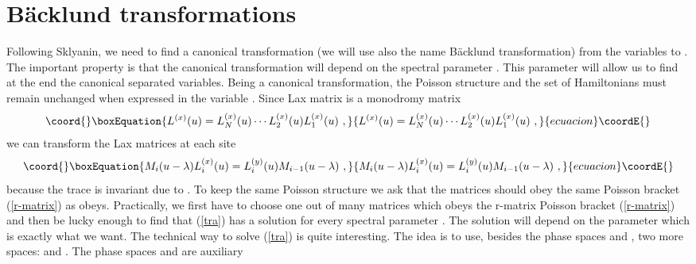 \documentclass[a4paper,11pt]{article}
\begin{document}
\section{B\"acklund transformations }
Following Sklyanin, we need to find a canonical transformation (we will use
also the name B\"acklund transformation) from the variables \coordHE{} to
\coordHE{}. The important property is that the canonical transformation will
depend on the spectral parameter \myHighlight{$\lambda $}\coordHE{}. This parameter \myHighlight{$\lambda $}\coordHE{} will
allow us to find at the end the canonical separated variables. Being a
canonical transformation, the Poisson structure and the set of Hamiltonians
\coordHE{} must remain unchanged when expressed in the variable \coordHE{}. Since
Lax matrix \coordHE{} is a monodromy matrix
\begin{equation}\coord{}\boxEquation{
\label{Mo}
L^{(x)}(u)=L_N^{(x)}(u) \cdots L_2^{(x)}(u)L_1^{(x)}(u) ~,
}{
L^{(x)}(u)=L_N^{(x)}(u) \cdots L_2^{(x)}(u)L_1^{(x)}(u) ~,
}{ecuacion}\coordE{}\end{equation}
we can transform the Lax matrices at each site \coordHE{}
\begin{equation}\coord{}\boxEquation{
\label{tra}
M_i(u-\lambda)L_i^{(x)}(u)=L_i^{(y)}(u)M_{i-1}(u-\lambda) ~,
}{
M_i(u-\lambda)L_i^{(x)}(u)=L_i^{(y)}(u)M_{i-1}(u-\lambda) ~,
}{ecuacion}\coordE{}\end{equation}
because the trace \coordHE{} is invariant due to
\coordHE{}. To keep the same
Poisson structure we ask that the matrices \coordHE{} should obey the same
Poisson bracket (\ref{r-matrix}) as \coordHE{} obeys. Practically, we first
have to choose one out of many matrices which obeys the r-matrix Poisson
bracket (\ref{r-matrix}) and then be lucky enough to find that (\ref{tra})
has a solution \coordHE{} for every spectral parameter \coordHE{}. The
solution will depend on the parameter \myHighlight{$\lambda $}\coordHE{} which is exactly what we
want. The technical way to solve (\ref{tra}) is quite interesting. The idea
is to use, besides the phase spaces \coordHE{} and \coordHE{}, two more spaces:
\coordHE{} and \coordHE{}. The phase spaces \coordHE{} and \coordHE{} are auxiliary
\end{document}

